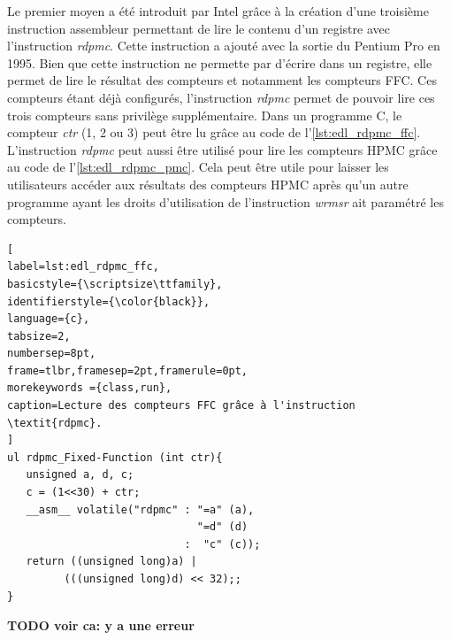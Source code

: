         Le premier moyen a été introduit par Intel grâce à la création d'une troisième instruction assembleur permettant de lire le contenu d'un registre avec l'instruction \textit{rdpmc}. Cette instruction a ajouté avec la sortie du Pentium Pro en 1995. Bien que cette instruction ne permette par d'écrire dans un registre, elle permet de lire le résultat des compteurs et notamment les compteurs FFC. Ces compteurs étant déjà configurés, l'instruction \textit{rdpmc} permet de pouvoir lire ces trois compteurs sans privilège supplémentaire. Dans un programme C, le compteur \textit{ctr} (1, 2 ou 3) peut être lu grâce au code de l'\autoref{lst:edl_rdpmc_ffc}. L'instruction \textit{rdpmc} peut aussi être utilisé pour lire les compteurs HPMC grâce au code de l'\autoref{lst:edl_rdpmc_pmc}. Cela peut être utile pour laisser les utilisateurs accéder aux résultats des compteurs HPMC après qu'un autre programme ayant les droits d'utilisation de l'instruction \textit{wrmsr} ait paramétré les compteurs.

\begin{minipage}{.45\textwidth}
\begin{lstlisting}[
label=lst:edl_rdpmc_ffc,
basicstyle={\scriptsize\ttfamily},
identifierstyle={\color{black}},
language={c},
tabsize=2,
numbersep=8pt,
frame=tlbr,framesep=2pt,framerule=0pt,
morekeywords ={class,run},
caption=Lecture des compteurs FFC grâce à l'instruction \textit{rdpmc}.
]
ul rdpmc_Fixed-Function (int ctr){
   unsigned a, d, c;
   c = (1<<30) + ctr;
   __asm__ volatile("rdpmc" : "=a" (a), 
                              "=d" (d) 
                            :  "c" (c));
   return ((unsigned long)a) | 
         (((unsigned long)d) << 32);;
}
\end{lstlisting}
\end{minipage}%
\hfill
%

\textbf{TODO voir ca: y a une erreur}

